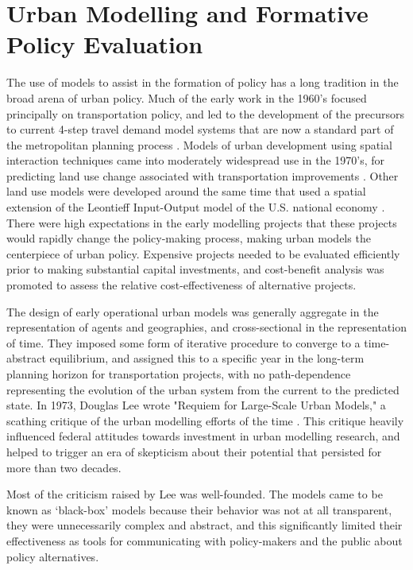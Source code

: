 \section{Urban Modelling and Formative Policy Evaluation}
The use of models to assist in the formation of policy has a long
tradition in the broad arena of urban policy.  Much of the early
work in the 1960's focused principally on transportation policy,
and led to the development of the precursors to current 4-step
travel demand model systems that are now a standard part of the
metropolitan planning process \cite{}. Models of urban development
using spatial interaction techniques came into moderately
widespread use in the 1970's, for predicting land use change
associated with transportation improvements
\cite{putman-book-1983}.  Other land use models were developed
around the same time that used a spatial extension of the
Leontieff Input-Output model of the U.S. national economy
\cite{echenique-transport-reviews-1990,delabarra-book-1995}. There
were high expectations in the early modelling projects that these
projects would rapidly change the policy-making process, making
urban models the centerpiece of urban policy.  Expensive projects
needed to be evaluated efficiently prior to making substantial
capital investments, and cost-benefit analysis was promoted to
assess the relative cost-effectiveness of alternative projects.

The design of early operational urban models was generally
aggregate in the representation of agents and geographies, and
cross-sectional in the representation of time.  They imposed some
form of iterative procedure to converge to a time-abstract
equilibrium, and assigned this to a specific year in the long-term
planning horizon for transportation projects, with no
path-dependence representing the evolution of the urban system
from the current to the predicted state.  In 1973, Douglas Lee
wrote "Requiem for Large-Scale Urban Models," a scathing critique
of the urban modelling efforts of the time
\cite{lee-1973,lee-1994}. This critique heavily influenced federal
attitudes towards investment in urban modelling research, and
helped to trigger an era of skepticism about their potential that
persisted for more than two decades.

Most of the criticism raised by Lee was well-founded.  The models
came to be known as `black-box' models because their behavior was
not at all transparent, they were unnecessarily complex and
abstract, and this significantly limited their effectiveness as
tools for communicating with policy-makers and the public about
policy alternatives.

